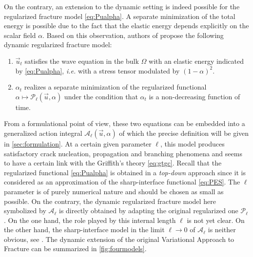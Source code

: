 On the contrary, an extension to the dynamic setting is indeed possible for the regularized fracture model \eqref{eq:Pualpha}. A separate minimization of the total energy is possible due to the fact that the elastic energy depends explicitly on the scalar field $\alpha$. Based on this observation, authors of \cite{Bourdin:2011} propose the following dynamic regularized fracture model:
\begin{enumerate}
\item $\vec{u}_t$ satisfies the wave equation in the bulk $\Omega$ with an elastic energy indicated by \eqref{eq:Pualpha}, \emph{i.e.} with a stress tensor modulated by $(1-\alpha)^2$.

\item $\alpha_t$ realizes a separate minimization of the regularized functional $\alpha\mapsto\mathcal{P}_\ell(\vec{u},\alpha)$ under the condition that $\alpha_t$ is a non-decreasing function of time.
\end{enumerate}
From a formulational point of view, these two equations can be embedded into a generalized action integral $\mathcal{A}_\ell(\vec{u},\alpha)$ of which the precise definition will be given in \cref{sec:formulation}. At a certain given parameter $\ell$, this model produces satisfactory crack nucleation, propagation and branching phenomena and seems to have a certain link with the Griffith's theory \eqref{eq:gtgc}. Recall that the regularized functional \eqref{eq:Pualpha} is obtained in a \emph{top-down} approach since it is considered as an approximation of the sharp-interface functional \eqref{eq:PES}. The $\ell$ parameter is of purely numerical nature and should be chosen as small as possible. On the contrary, the dynamic regularized fracture model \cite{Bourdin:2011} here symbolized by $\mathcal{A}_\ell$ is directly obtained by adapting the original regularized one $\mathcal{P}_\ell$. On the one hand, the role played by this internal length $\ell$ is not yet clear. On the other hand, the sharp-interface model in the limit $\ell\to 0$ of $\mathcal{A}_\ell$ is neither obvious, see \cite{Bourdin:2011}. The dynamic extension of the original Variational Approach to Fracture \cite{BourdinFrancfortMarigo:2008} can be summarized in \cref{fig:fourmodels}.
